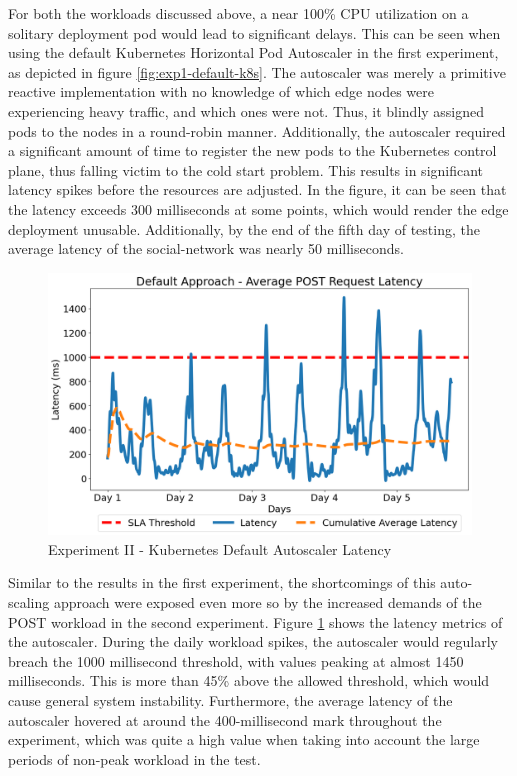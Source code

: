 For both the workloads discussed above, a near 100\% CPU utilization on a solitary deployment pod would lead to significant delays. This can be seen when using the default Kubernetes Horizontal Pod Autoscaler in the first experiment, as depicted in figure \ref{fig:exp1-default-k8s}. The autoscaler was merely a primitive reactive implementation with no knowledge of which edge nodes were experiencing heavy traffic, and which ones were not. Thus, it blindly assigned pods to the nodes in a round-robin manner. Additionally, the autoscaler required a significant amount of time to register the new pods to the Kubernetes control plane, thus falling victim to the cold start problem. This results in significant latency spikes before the resources are adjusted. In the figure, it can be seen that the latency exceeds 300 milliseconds at some points, which would render the edge deployment unusable. Additionally, by the end of the fifth day of testing, the average latency of the social-network was nearly 50 milliseconds.\par

\begin{figure}[htb]
    \centering
    \caption{Experiment II - Kubernetes Default Autoscaler Latency}
    \label{fig:exp2-default-k8s}
    \includegraphics[width=0.6\linewidth]{Figures/Compose-Post-Default-Latency.png}
\end{figure}

Similar to the results in the first experiment, the shortcomings of this auto-scaling approach were exposed even more so by the increased demands of the POST workload in the second experiment. Figure \ref{fig:exp2-default-k8s} shows the latency metrics of the autoscaler. During the daily workload spikes, the autoscaler would regularly breach the 1000 millisecond threshold, with values peaking at almost 1450 milliseconds. This is more than 45\% above the allowed threshold, which would cause general system instability. Furthermore, the average latency of the autoscaler hovered at around the 400-millisecond mark throughout the experiment, which was quite a high value when taking into account the large periods of non-peak workload in the test.\par

